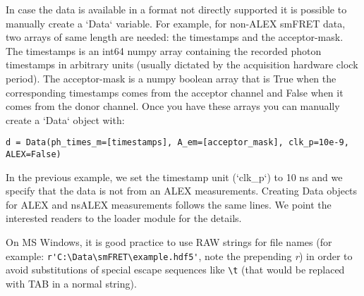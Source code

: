 In case the data is available in a format not directly supported it is possible to manually create a `Data` variable. For example, for non-ALEX smFRET data, two arrays of same length are needed: the timestamps and the acceptor-mask. The timestamps is an int64 numpy array containing the recorded photon timestamps in arbitrary units (usually dictated by the acquisition hardware clock period). The acceptor-mask is a numpy boolean array that is True when the corresponding timestamps comes from the acceptor channel and False when it comes from the donor channel. Once you have these arrays you can manually create a `Data` object with:

\verb|d = Data(ph_times_m=[timestamps], A_em=[acceptor_mask], clk_p=10e-9, ALEX=False)|

In the previous example, we set the timestamp unit (`clk_p`) to 10 ns and we specify that the data is not from an ALEX measurements. Creating Data objects for ALEX and nsALEX measurements follows the same lines. We point the interested readers to the loader module for the details.

On MS Windows, it is good practice to use RAW strings for file names (for example: \verb|r'C:\Data\smFRET\example.hdf5'|, note the prepending \textit{r}) in order to avoid substitutions of special escape sequences like \verb|\t| (that would be replaced with TAB in a normal string).

